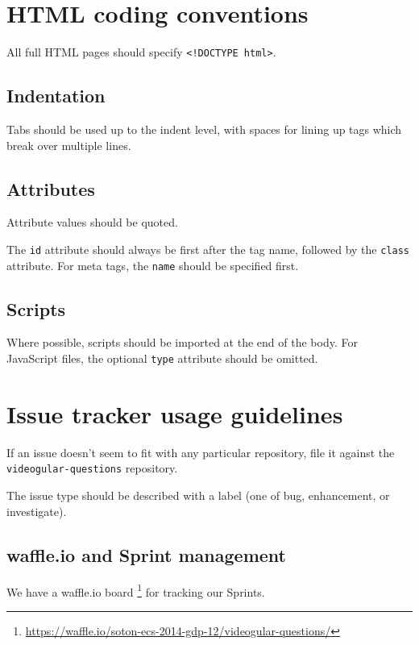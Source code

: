 \section{HTML coding conventions}

All full HTML pages should specify
\texttt{\textless{}!DOCTYPE html\textgreater{}}.

\subsection{Indentation}

Tabs should be used up to the indent level, with spaces for lining up
tags which break over multiple lines.

\subsection{Attributes}

Attribute values should be quoted.

The \texttt{id} attribute should always be first after the tag name,
followed by the \texttt{class} attribute. For meta tags, the
\texttt{name} should be specified first.

\subsection{Scripts}

Where possible, scripts should be imported at the end of the body. For
JavaScript files, the optional \texttt{type} attribute should be
omitted.

\section{Issue tracker usage guidelines}

If an issue doesn't seem to fit with any particular repository, file it
against the \texttt{videogular-questions} repository.

The issue type should be described with a label (one of bug,
enhancement, or investigate).

\subsection{waffle.io and Sprint management}

We have a waffle.io board
\footnote{\url{https://waffle.io/soton-ecs-2014-gdp-12/videogular-questions/}}
for tracking our Sprints.

